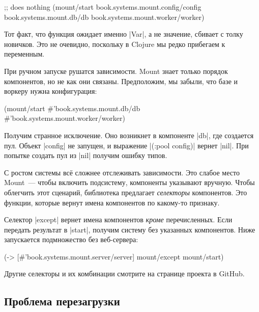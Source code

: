 \begin{english}
  \begin{clojure}
;; does nothing
(mount/start
  book.systems.mount.config/config
  book.systems.mount.db/db
  book.systems.mount.worker/worker)
  \end{clojure}
\end{english}

Тот факт, что функция ожидает именно \spverb|Var|, а не значение, сбивает с
толку новичков. Это не очевидно, поскольку в Clojure мы редко прибегаем к
переменным.

При ручном запуске рушатся зависимости. Mount знает только порядок компонентов,
но не как они связаны. Предположим, мы забыли, что базе и воркеру нужна
конфигурация:

\begin{english}
  \begin{clojure}
(mount/start
  #'book.systems.mount.db/db
  #'book.systems.mount.worker/worker)
  \end{clojure}
\end{english}

Получим странное исключение. Оно возникнет в компоненте \spverb|db|, где
создается пул. Объект \spverb|config| не запущен, и выражение
\spverb|(:pool config)| вернет \spverb|nil|. При попытке создать
пул из \spverb|nil| получим ошибку типов.

С ростом системы вс\"{е} сложнее отслеживать зависимости. Это слабое место
Mount~--- чтобы включить подсистему, компоненты указывают вручную. Чтобы
облегчить этот сценарий, библиотека предлагает \emph{селекторы} компонентов. Это
функции, которые вернут имена компонентов по какому-то признаку.

Селектор \spverb|except| вернет имена компонентов \emph{кроме}
перечисленных. Если передать результат в \spverb|start|, получим систему без
указанных компонентов. Ниже запускается подмножество без веб-сервера:

\begin{english}
  \begin{clojure}
(-> [#'book.systems.mount.server/server]
    mount/except
    mount/start)
  \end{clojure}
\end{english}

Другие селекторы и их комбинации смотрите на странице проекта в GitHub.

\subsection{Проблема перезагрузки}


